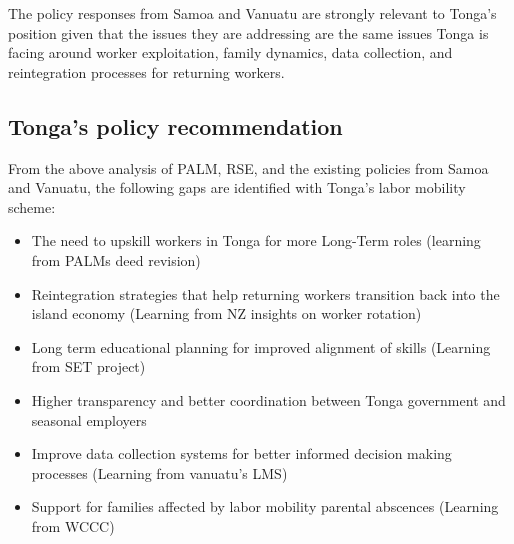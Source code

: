 \documentclass[9pt,a4paper,twocolumn,twoside]{tau-class/tau}
\begin{document}
The policy responses from Samoa and Vanuatu are strongly relevant to Tonga's position given that the issues they are addressing are the same issues Tonga is facing around worker exploitation, family dynamics, data collection, and reintegration processes for returning workers.

 

\subsection{Tonga's policy recommendation}

\begin{tauenv}[frametitle=Policy Recommendation]
        From the above analysis of PALM, RSE, and the existing policies from Samoa and Vanuatu, the following gaps are identified with Tonga's labor mobility scheme:  
        \begin{itemize}
            \item The need to upskill workers in Tonga for more Long-Term roles (learning from PALMs deed revision)
            \item Reintegration strategies that help returning workers transition back into the island economy (Learning from NZ insights on worker rotation)
            \item Long term educational planning for improved alignment of skills (Learning from SET project)
            \item Higher transparency and better coordination between Tonga government and seasonal employers
            \item Improve data collection systems for better informed decision making processes (Learning from vanuatu's LMS)
            \item Support for families affected by labor mobility parental abscences (Learning from WCCC)

        \end{itemize}
\end{tauenv}

 
\end{document}

